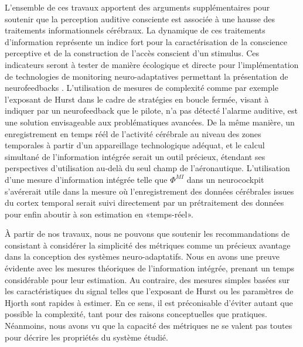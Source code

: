 L’ensemble de ces travaux apportent des arguments supplémentaires pour soutenir que la perception auditive consciente est associée à une hausse des traitements informationnels cérébraux. 
La dynamique de ces traitements d'information représente un indice fort pour la caractérisation de la conscience perceptive et de la construction de l'accès conscient d'un stimulus. 
Ces indicateurs seront à tester de manière écologique et directe pour l'implémentation de technologies de monitoring neuro-adaptatives permettant la présentation de neurofeedbacks \citep{nuno2021real}. 
L'utilisation de mesures de complexité comme par exemple l'exposant de Hurst dans le cadre de stratégies en boucle fermée, visant à indiquer par un neurofeedback que le pilote, n'a pas détecté l'alarme auditive, est une solution envisageable aux problématiques avancées. 
De la même manière, un enregistrement en temps réél de l'activité cérébrale au niveau des zones temporales à partir d'un appareillage technologique adéquat, et le calcul simultané de l'information intégrée serait un outil précieux, étendant ses perspectives d'utilisation au-delà du seul champ de l'aéronautique. 
L'utilisation d'une mesure d'information intégrée telle que $\Phi^{MI}$ dans un neurocockpit s'avérerait utile dans la mesure où l'enregistrement des données cérébrales issues du cortex temporal serait suivi directement par un prétraitement des données pour enfin aboutir à son estimation en «temps-réel». 

À partir de nos travaux, nous ne pouvons que soutenir les recommandations de \cite{verdiere2019approche} consistant à considérer la simplicité des métriques comme un précieux avantage dans la conception des systèmes neuro-adaptatifs. 
Nous en avons une preuve évidente avec les mesures théoriques de l'information intégrée, prenant un temps considérable pour leur estimation. 
Au contraire, des mesures simples basées sur les caractéristiques du signal telles que l'exposant de Hurst ou les paramètres de Hjorth sont rapides à estimer. 
En ce sens, il est préconisable d'éviter autant que possible la complexité, tant pour des raisons conceptuelles que pratiques. 
Néanmoins, nous avons vu que la capacité des métriques ne se valent pas toutes pour décrire les propriétés du système étudié. 

